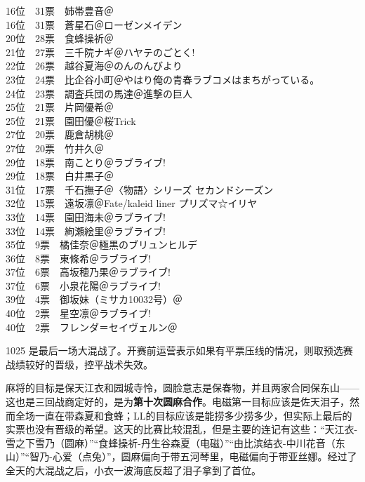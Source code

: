 {    16位　31票　姉帯豊音＠\Saki\\
    16位　31票　蒼星石＠ローゼンメイデン\\
    20位　28票　食蜂操祈＠\Railgan\\
    21位　27票　三千院ナギ＠ハヤテのごとく!\\
    22位　26票　越谷夏海＠のんのんびより\\
    23位　24票　比企谷小町＠やはり俺の青春ラブコメはまちがっている。\\
    24位　23票　調査兵団の馬達＠進撃の巨人\\
    25位　21票　片岡優希＠\Saki\\
    25位　21票　園田優＠桜Trick\\
    27位　20票　鹿倉胡桃＠\Saki\\
    27位　20票　竹井久＠\Saki\\
    29位　18票　南ことり＠ラブライブ!\\
    29位　18票　白井黒子＠\Railgan\\
    31位　17票　千石撫子＠〈物語〉シリーズ セカンドシーズン\\
    32位　15票　遠坂凛＠Fate/kaleid liner プリズマ☆イリヤ\\
    33位　14票　園田海未＠ラブライブ!\\
    33位　14票　絢瀬絵里＠ラブライブ!\\
    35位　9票　橘佳奈＠極黒のブリュンヒルデ\\
    36位　8票　東條希＠ラブライブ!\\
    37位　6票　高坂穂乃果＠ラブライブ!\\
    37位　6票　小泉花陽＠ラブライブ!\\
    39位　4票　御坂妹（ミサカ10032号）＠\Railgan\\
    40位　2票　星空凛＠ラブライブ!\\
    40位　2票　フレンダ＝セイヴェルン＠\Railgan
}

1025 是最后一场大混战了。开赛前运营表示如果有平票压线的情况，则取预选赛战绩较好的晋级，控平战术失效。

麻将的目标是保天江衣和园城寺怜，圆脸意志是保春物，并且两家合同保东山——这也是三回战商定好的，是为\textbf{第十次圆麻合作}。电磁第一目标应该是佐天泪子，然而全场一直在带森夏和食蜂；LL的目标应该是能捞多少捞多少，但实际上最后的实票也没有晋级的希望。这天的比赛比较混乱，但是主要的连记有这些：“天江衣-雪之下雪乃（圆麻）”“食蜂操祈-丹生谷森夏（电磁）”“由比滨结衣-中川花音（东山）”“智乃-心爱（点兔）”，圆麻偏向于带五河琴里，电磁偏向于带亚丝娜。经过了全天的大混战之后，小衣一波海底反超了泪子拿到了首位。

